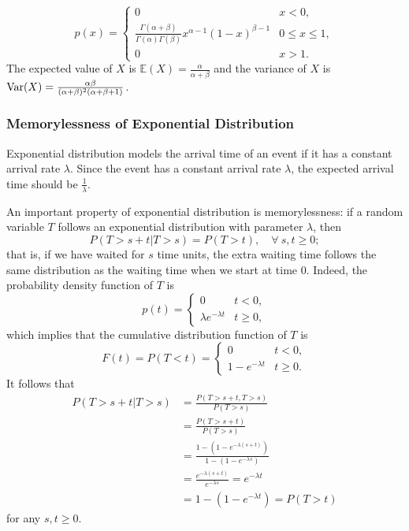 \documentclass[12pt,letterpaper, onecolumn]{exam}
\begin{document}
\begin{enumerate}
    $$p(x)=\begin{cases}
        0&x<0,\\
        \frac{\Gamma(\alpha+\beta)}{\Gamma(\alpha)\Gamma(\beta)}x^{\alpha-1}(1-x)^{\beta-1}&0\le x\le 1,\\
        0&x>1.
    \end{cases}$$
    The expected value of $X$ is $\mathbb{E}(X)=\frac{\alpha}{\alpha+\beta}$ and the variance of $X$ is ${\rm{Var}}(X)=\frac{\alpha\beta}{(\alpha+\beta)^2(\alpha+\beta+1)}$.
\end{enumerate}

\subsubsection{Memorylessness of Exponential Distribution}

 Exponential distribution models the arrival time of an event if it has a constant arrival rate $\lambda$. Since the event has a constant arrival rate $\lambda$, the expected arrival time should be $\frac{1}{\lambda}$. 

\quad An important property of exponential distribution is memorylessness: if a random variable $T$ follows an exponential distribution with parameter $\lambda$, then
\begin{equation}\label{20250212equaton7}
    P(T>s+t|T>s)=P(T>t),\quad\forall\ s,t\ge 0;
\end{equation}
that is, if we have waited for $s$ time units, the extra waiting time follows the same distribution as the waiting time when we start at time $0$. Indeed, the probability density function of $T$ is 
$$p(t)=\begin{cases}
    0&t<0,\\
    \lambda e^{-\lambda t}&t\ge 0,
\end{cases}$$
which implies that the cumulative distribution function of $T$ is 
$$F(t)=P(T<t)=\begin{cases}
    0&t<0,\\
    1-e^{-\lambda t}&t\ge 0.
\end{cases}$$
It follows that 
\begin{align*}
    P(T>s+t|T>s)&=\frac{P(T>s+t,T>s)}{P(T>s)}\\
    &=\frac{P(T>s+t)}{P(T>s)}\\
    &=\frac{1-(1-e^{-\lambda(s+t)})}{1-(1-e^{-\lambda s})}\\
    &=\frac{e^{-\lambda(s+t)}}{e^{-\lambda s}}=e^{-\lambda t}\\
    &=1-(1-e^{-\lambda t})=P(T>t)
\end{align*}
for any $s,t\ge 0$.
\end{document}
